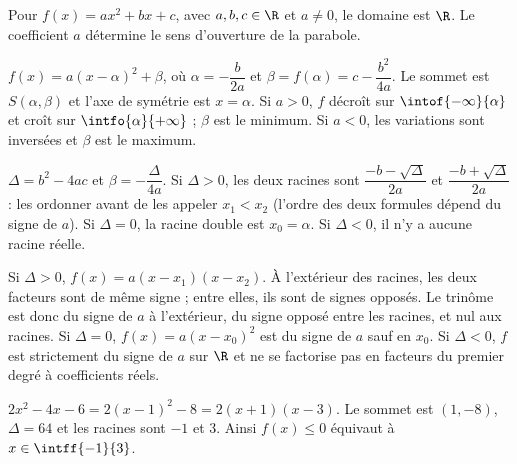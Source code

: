 
\begin{definition}
Pour $f(x)=ax^2+bx+c$, avec $a,b,c\in\R$ et $a\neq0$, le domaine est $\R$. Le coefficient $a$ détermine le sens d’ouverture de la parabole.
\end{definition}

\begin{theorem}
$f(x)=a(x-\alpha)^2+\beta$, où $\alpha=-\dfrac{b}{2a}$ et $\beta=f(\alpha)=c-\dfrac{b^2}{4a}$. Le sommet est $S(\alpha,\beta)$ et l’axe de symétrie est $x=\alpha$. Si $a>0$, $f$ décroît sur $\intof{-\infty}{\alpha}$ et croît sur $\intfo{\alpha}{+\infty}$ ; $\beta$ est le minimum. Si $a<0$, les variations sont inversées et $\beta$ est le maximum.
\end{theorem}

\begin{theorem}
$\Delta=b^2-4ac$ et $\beta=-\dfrac{\Delta}{4a}$. Si $\Delta>0$, les deux racines sont $\dfrac{-b-\sqrt\Delta}{2a}$ et $\dfrac{-b+\sqrt\Delta}{2a}$ : les ordonner avant de les appeler $x_1<x_2$ (l’ordre des deux formules dépend du signe de $a$). Si $\Delta=0$, la racine double est $x_0=\alpha$. Si $\Delta<0$, il n’y a aucune racine réelle.
\end{theorem}

\begin{keypoint}
Si $\Delta>0$, $f(x)=a(x-x_1)(x-x_2)$. À l’extérieur des racines, les deux facteurs sont de même signe ; entre elles, ils sont de signes opposés. Le trinôme est donc du signe de $a$ à l’extérieur, du signe opposé entre les racines, et nul aux racines. Si $\Delta=0$, $f(x)=a(x-x_0)^2$ est du signe de $a$ sauf en $x_0$. Si $\Delta<0$, $f$ est strictement du signe de $a$ sur $\R$ et ne se factorise pas en facteurs du premier degré à coefficients réels.
\end{keypoint}

\begin{example}
$2x^2-4x-6=2(x-1)^2-8=2(x+1)(x-3)$. Le sommet est $(1,-8)$, $\Delta=64$ et les racines sont $-1$ et $3$. Ainsi $f(x)\leq0$ équivaut à $x\in\intff{-1}{3}$.
\end{example}

\begin{figurebox}
\end{figurebox}

